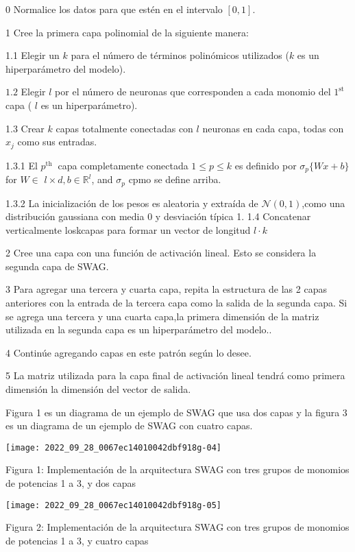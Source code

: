 \documentclass[10pt]{article}
\begin{document}
0 Normalice los datos para que estén en el intervalo $[0,1]$.

1 Cree la primera capa polinomial de la siguiente manera:

1.1 Elegir un $k$ para el número de términos polinómicos utilizados ($k$ es un hiperparámetro del modelo).

$1.2$ Elegir $l$ por el número de neuronas que corresponden a cada monomio del $1^{\text {st }}$ capa ( $l$ es un hiperparámetro).

1.3 Crear $k$ capas totalmente conectadas con $l$ neuronas en cada capa, todas con $x_{j}$ como sus entradas.

1.3.1 El $p^{\text {th }}$ capa completamente conectada $1 \leq p \leq k$ es definido por $\sigma_{p}\{W x+b\}$ for $W \in$ $l \times d, b \in \mathbb{R}^{l}$, and $\sigma_{p}$ cpmo se define arriba.

1.3.2 La inicialización de los pesos es aleatoria y extraída de $\mathcal{N}(0,1)$,como una distribución gaussiana con media 0 y desviación típica 1. 1.4 Concatenar verticalmente loskcapas para formar un vector de longitud $l \cdot k$

2 Cree una capa con una función de activación lineal. Esto se considera la segunda capa de SWAG.

3 Para agregar una tercera y cuarta capa, repita la estructura de las 2 capas anteriores con la entrada de la tercera capa como la salida de la segunda capa. Si se agrega una tercera y una cuarta capa,la primera dimensión de la matriz utilizada en la segunda capa es un hiperparámetro del modelo..

4 Continúe agregando capas en este patrón según lo desee.

5 La matriz utilizada para la capa final de activación lineal tendrá como primera dimensión la dimensión del vector de salida.

Figura 1 es un diagrama de un ejemplo de SWAG que usa dos capas y la figura 3 es un diagrama de un ejemplo de SWAG con cuatro capas.

\texttt{[image: 2022\_09\_28\_0067ec14010042dbf918g-04]}

Figura 1: Implementación de la arquitectura SWAG con tres grupos de monomios de potencias 1 a 3, y dos capas

\texttt{[image: 2022\_09\_28\_0067ec14010042dbf918g-05]}

Figura 2: Implementación de la arquitectura SWAG con tres grupos de monomios de potencias 1 a 3, y cuatro capas
\end{document}
